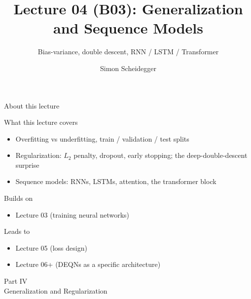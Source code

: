 \documentclass[aspectratio=169,11pt]{beamer}
\title[Lecture 04 (B03)]{Lecture 04 (B03): Generalization and Sequence Models}
\subtitle{Bias-variance, double descent, RNN / LSTM / Transformer}
\author{Simon Scheidegger}
\institute{HEC, University of Lausanne}
\date{}
\begin{document}
{
\begin{frame}
\titlepage
\end{frame}
}

\begin{frame}{About this lecture}
\small
\begin{block}{What this lecture covers}
\begin{itemize}\itemsep2pt
  \item Overfitting vs underfitting, train / validation / test splits
  \item Regularization: $L_2$ penalty, dropout, early stopping; the deep-double-descent surprise
  \item Sequence models: RNNs, LSTMs, attention, the transformer block
\end{itemize}
\end{block}
\begin{block}{Builds on}
\begin{itemize}\itemsep2pt
  \item Lecture 03 (training neural networks)
\end{itemize}
\end{block}
\begin{block}{Leads to}
\begin{itemize}\itemsep2pt
  \item Lecture 05 (loss design)
  \item Lecture 06+ (DEQNs as a specific architecture)
\end{itemize}
\end{block}
\end{frame}

\begin{frame}{}
\begin{center}
{\Huge \textcolor{uzhblue}{Part IV}}\\[0.8em]
{\LARGE Generalization and Regularization}
\end{center}
\end{frame}
\end{document}
